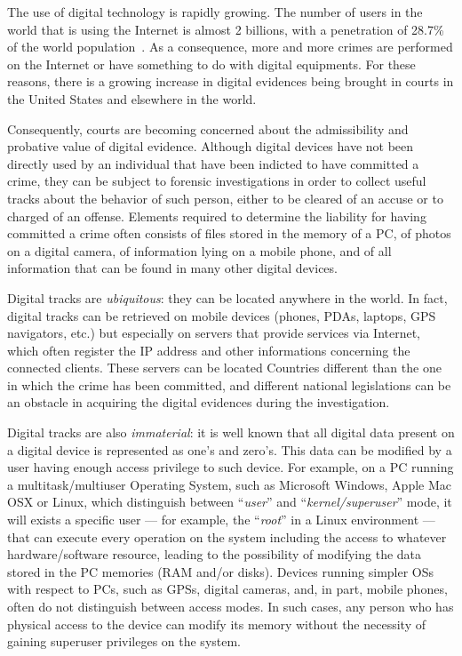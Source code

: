 \documentclass[runningheads,english]{llncs}
\begin{document}
The use of digital technology is rapidly growing. The number of users in the
world that is using the Internet is almost 2 billions, with a penetration of
28.7\% of the world population~\cite{stat}. As a consequence, more and more
crimes are performed on the Internet or have something to do with digital 
equipments. For these reasons, there is a growing increase in digital evidences 
being brought in courts in the United States and elsewhere in the world. 

Consequently, courts are becoming concerned about the admissibility and probative 
value of digital evidence. Although digital devices have not been directly used by an 
individual that have been indicted to have committed a crime, they can be subject to 
forensic investigations in order to collect useful tracks about the behavior of such 
person, either to be cleared of an accuse or to charged of an offense. Elements 
required to determine the liability for having committed a crime often consists of files
stored in the memory of a PC, of photos on a digital camera, of information lying on 
a mobile phone, and of all information that can be found in many other digital devices.

Digital tracks are \emph{ubiquitous}: they can be located anywhere in the world. In
fact, digital tracks can be retrieved on mobile devices (phones, PDAs, laptops,
GPS navigators, etc.) but especially on servers that provide services via
Internet, which often register the IP address and other informations concerning
the connected clients. These servers can be located Countries different than the
one in which the crime has been committed, and different national legislations
can be an obstacle in acquiring the digital evidences during the investigation.

Digital tracks are also \emph{immaterial}: it is well known that all digital data
present on a digital device is represented as one's and zero's. This data can be
modified by a user having enough access privilege to such device. For example,
on a PC running a multitask/multiuser Operating System, such as Microsoft Windows, 
Apple Mac OSX or Linux, which distinguish between ``\emph{user}'' and ``\emph{kernel/superuser}'' 
mode, it will exists a specific user --- for example, the ``\emph{root}'' in a Linux 
environment --- that can execute every operation on the system including the 
access to whatever hardware/software resource, leading to the possibility of 
modifying the data stored in the PC memories (RAM and/or disks). 
Devices running simpler OSs with respect to PCs, such as GPSs, digital cameras, 
and, in part, mobile phones, often do not distinguish between access modes. 
In such cases, any person who has physical access to the device can modify its 
memory without the necessity of gaining superuser privileges on the system.\\
\end{document}
